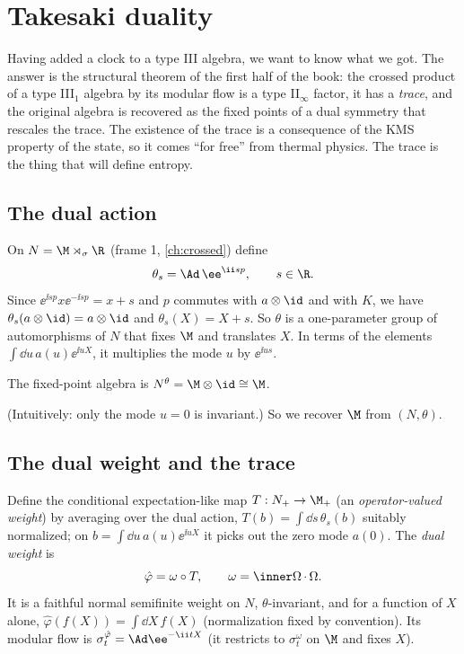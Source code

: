 \chapter{Takesaki duality}\label{ch:takesaki}

\begin{physmotiv}
Having added a clock to a type III algebra, we want to know what we got. The answer is the structural theorem of the first half of the book: the crossed product of a type III$_1$ algebra by its modular flow is a type II$_\infty$ factor, it has a \emph{trace}, and the original algebra is recovered as the fixed points of a dual symmetry that rescales the trace. The existence of the trace is a consequence of the KMS property of the state, so it comes ``for free'' from thermal physics. The trace is the thing that will define entropy.
\end{physmotiv}

\section{The dual action}

On $N=\M\rtimes_\sigma\R$ (frame 1, \cref{ch:crossed}) define
\begin{equation}
\theta_s=\Ad\,\ee^{\ii sp},\qquad s\in\R.
\end{equation}
Since $\ee^{\ii sp}x\ee^{-\ii sp}=x+s$ and $p$ commutes with $a\otimes\id$ and with $K$, we have $\theta_s(a\otimes\id)=a\otimes\id$ and $\theta_s(X)=X+s$. So $\theta$ is a one-parameter group of automorphisms of $N$ that fixes $\M$ and translates $X$. In terms of the elements $\int\dd u\,a(u)\ee^{\ii uX}$, it multiplies the mode $u$ by $\ee^{\ii us}$.

\begin{proposition}
The fixed-point algebra is $N^\theta=\M\otimes\id\cong\M$.
\end{proposition}
(Intuitively: only the mode $u=0$ is invariant.) So we recover $\M$ from $(N,\theta)$.

\section{The dual weight and the trace}

Define the conditional expectation-like map $T:N_+\to\M_+$ (an \emph{operator-valued weight}) by averaging over the dual action, $T(b)=\int\dd s\,\theta_s(b)$ suitably normalized; on $b=\int\dd u\,a(u)\ee^{\ii uX}$ it picks out the zero mode $a(0)$. The \emph{dual weight} is
\begin{equation}
\hat\varphi=\omega\circ T,\qquad\omega=\inner\Omega{\,\cdot\,\Omega}.
\end{equation}
It is a faithful normal semifinite weight on $N$, $\theta$-invariant, and for a function of $X$ alone, $\hat\varphi(f(X))=\int\dd X\,f(X)$ (normalization fixed by convention). Its modular flow is $\sigma^{\hat\varphi}_t=\Ad\ee^{-\ii tX}$ (it restricts to $\sigma^\omega_t$ on $\M$ and fixes $X$).

